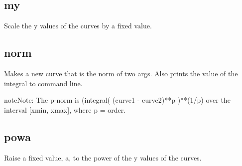 \documentclass[letterpaper,10pt,english]{sphinxmanual}
\begin{document}
\subsection{my}
\label{\detokenize{math_operations:my}}
Scale the y values of the curves by a fixed value.

\begin{sphinxVerbatim}[commandchars=\\\{\}]
\PYG{p}{[}\PYG{p}{]}   
\end{sphinxVerbatim}


\subsection{norm}
\label{\detokenize{math_operations:norm}}
Makes a new curve that is the norm of two args. Also prints the value of the integral to command line.

\begin{sphinxVerbatim}[commandchars=\\\{\}]
\PYG{p}{[}\PYG{p}{]}      
\end{sphinxVerbatim}

\begin{sphinxadmonition}{note}{Note:}
The p-norm is (integral( (curve1 - curve2)**p )**(1/p) over the interval {[}xmin, xmax{]},
where p = order.
\end{sphinxadmonition}


\subsection{powa}
\label{\detokenize{math_operations:powa}}
Raise a fixed value, a, to the power of the y values of the curves.

\begin{sphinxVerbatim}[commandchars=\\\{\}]
\PYG{p}{[}\PYG{p}{]}   
\end{sphinxVerbatim}
\end{document}
